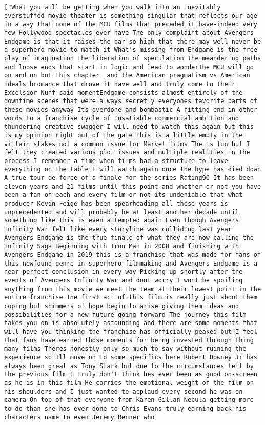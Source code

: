 \documentclass[11pt]{article}
\begin{document}
\begin{Verbatim}[commandchars=\\\{\}]
["What you will be getting when you walk into an inevitably overstuffed movie theater is something singular that reflects our age in a way that none of the MCU films that preceded it have-indeed very few Hollywood spectacles ever have The only complaint about Avengers Endgame is that it raises the bar so high that there may well never be a superhero movie to match it What's missing from Endgame is the free play of imagination the liberation of speculation the meandering paths and loose ends that start in logic and lead to wonderThe MCU will go on and on but this chapter  and the American pragmatism vs American ideals bromance that drove it have well and truly come to their Excelsior Nuff said momentEndgame consists almost entirely of the downtime scenes that were always secretly everyones favorite parts of these movies anyway Its overdone and bombastic A fitting end in other words to a franchise cycle of insatiable commercial ambition and thundering creative swagger I will need to watch this again but this is my opinion right out of the gate This is a little empty in the villain stakes not a common issue for Marvel films The is fun but I felt they created various plot issues and multiple realities in the process I remember a time when films had a structure to leave everything on the table I will watch again once the hype has died down A true tour de force of a finale for the series Rating90 It has been eleven years and 21 films until this point and whether or not you have been a fan of each and every film or not its undeniable that what producer Kevin Feige has been spearheading all these years is unprecedented and will probably be at least another decade until something like this is even attempted again Even though Avengers Infinity War felt like every storyline was colliding last year Avengers Endgame is the true finale of what they are now calling the Infinity Saga Beginning with Iron Man in 2008 and finishing with Avengers Endgame in 2019 this is a franchise that was made for fans of this newfound genre in superhero filmmaking and Avengers Endgame is a near-perfect conclusion in every way Picking up shortly after the events of Avengers Infinity War and dont worry I wont be spoiling anything from this movie we meet the team at their lowest point in the entire franchise The first act of this film is really just about them coping but shimmers of hope begin to arise giving them ideas and possibilities for a new future going forward The journey this film takes you on is absolutely astounding and there are some moments that will have you thinking the franchise has officially peaked but I feel that fans have earned those moments for being invested through thing many films Theres honestly only so much to say without ruining the experience so Ill move on to some specifics here Robert Downey Jr has always been great as Tony Stark but due to the circumstances left by the previous film I truly don't think hes ever been as good on-screen as he is in this film He carries the emotional weight of the film on his shoulders and I just wanted to applaud every second he was on camera On top of that everyone from Karen Gillan Nebula getting more to do than she has ever done to Chris Evans truly earning back his characters name to even Jeremy Renner who 
\end{Verbatim}
\end{document}
